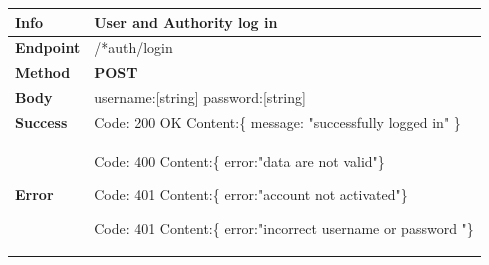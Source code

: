 \begin{table}[H]
\begin{tabular}{|l|p{}|}
\hline
\textbf{Info}             & User and Authority log in                                                                       \\ \hline
\textbf{Endpoint}    &  /*auth/login\\ \hline
\textbf{Method}         &   \textbf{POST}                                                                            \\ \hline

\textbf{Body}  &     username:[string] \newline
                   password:[string] 
              
                    \\ \hline
                    
\textbf{Success} &  Code: 200 OK \newline
                    Content:\{\newline 
                    message: "successfully logged in"\newline 
                    \}\\ \hline
\textbf{Error} &  Code: 400 \newline
                  Content:\{\newline
                  error:"data are not valid"\newline\}\newline
                  
                  Code: 401 \newline
                  Content:\{\newline
                  error:"account not activated"\newline\}\newline
                  
                  Code: 401 \newline
                  Content:\{\newline
                  error:"incorrect username or password "\newline\}\\\hline

\end{tabular}
\end{table}






